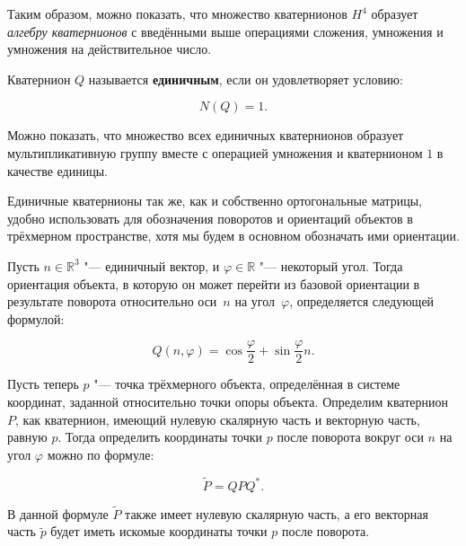 Таким образом, можно показать, что множество кватернионов $H^4$ образует \textit{алгебру кватернионов} с введёнными
выше операциями сложения, умножения и умножения на действительное число.

\begin{definition}
Кватернион $Q$ называется \textbf{единичным}, если он удовлетворяет условию:

$$
N(Q)=1.
$$
\end{definition}

Можно показать, что множество всех единичных кватернионов образует мультипликативную группу вместе с операцией
умножения и кватернионом $1$ в качестве единицы.

Единичные кватернионы так же, как и собственно ортогональные матрицы, удобно использовать для обозначения поворотов и
ориентаций объектов в трёхмерном пространстве, хотя мы будем в основном обозначать ими ориентации.

Пусть $n \in \mathbb{R}^3$ "--- единичный вектор, и $\varphi \in \mathbb{R}$ "--- некоторый угол. Тогда ориентация
объекта, в которую он может перейти из базовой ориентации в результате поворота относительно оси~$n$ на угол~$\varphi$,
определяется следующей формулой:

$$
Q(n,\varphi)=\cos\frac{\varphi}{2}+\sin\frac{\varphi}{2}n.
$$

Пусть теперь $p$ "--- точка трёхмерного объекта, определённая в системе координат, заданной относительно точки опоры
объекта. Определим кватернион $P$, как кватернион, имеющий нулевую скалярную часть и векторную часть, равную $p$.
Тогда определить координаты точки $p$ после поворота вокруг оси $n$ на угол $\varphi$ можно по формуле:

$$
\tilde P=QPQ^*.
$$

В данной формуле $\tilde P$ также имеет нулевую скалярную часть, а его векторная часть $\tilde p$ будет иметь искомые
координаты точки $p$ после поворота.
